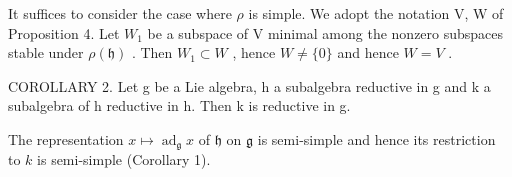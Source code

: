 It suffices to consider the case where \(\rho\) is simple. We adopt the notation V, W of Proposition 4. Let \(W_{1}\) be a subspace of V minimal among the nonzero subspaces stable under \(\rho(\mathfrak{h})\) . Then \(W_{1} \subset W\) , hence \(W \neq \{0\}\) and hence \(W = V\) .

COROLLARY 2. Let g be a Lie algebra, h a subalgebra reductive in g and k a subalgebra of h reductive in h. Then k is reductive in g.

The representation \(x \mapsto \operatorname{ad}_{\mathfrak{g}} x\) of \(\mathfrak{h}\) on \(\mathfrak{g}\) is semi-simple and hence its restriction to \(k\) is semi-simple (Corollary 1).

